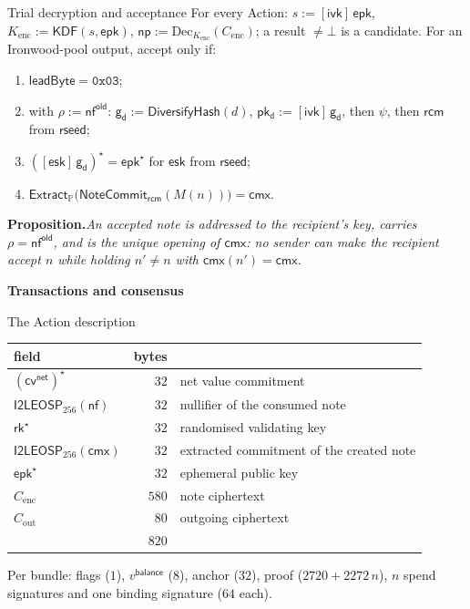 \documentclass[aspectratio=169,11pt]{beamer}
\newcommand{\nfsym}{\ensuremath{\mathsf{nf}}}
\newcommand{\cmx}{\ensuremath{\mathsf{cmx}}}
\newcommand{\cvsym}{\ensuremath{\mathsf{cv}}}
\newcommand{\rksym}{\ensuremath{\mathsf{rk}}}
\newcommand{\gd}{\ensuremath{\mathsf{g_d}}}
\newcommand{\pkd}{\ensuremath{\mathsf{pk_d}}}
\newcommand{\ivk}{\ensuremath{\mathsf{ivk}}}
\newcommand{\rcm}{\ensuremath{\mathsf{rcm}}}
\newcommand{\esk}{\ensuremath{\mathsf{esk}}}
\newcommand{\epk}{\ensuremath{\mathsf{epk}}}
\newcommand{\Extract}{\ensuremath{\mathsf{Extract}}}
\newcommand{\NoteCommit}{\ensuremath{\mathsf{NoteCommit}}}
\newcommand{\Ecenc}{\ensuremath{C_{\mathrm{enc}}}}
\newcommand{\Ecout}{\ensuremath{C_{\mathrm{out}}}}
\newcommand{\divider}[1]{\begin{frame}[plain]\vfill\centering
  {\usebeamercolor[fg]{structure}\Huge\bfseries #1}\vfill\end{frame}}
\newcommand{\PP}{\mathbb{P}}
\newcommand{\Ext}{\Extract_{\PP}}
\newcommand{\rk}{\rksym}
\newcommand{\Ilep}[1]{\mathsf{I2LEOSP}_{#1}}
\newcommand{\DivH}{\mathsf{DiversifyHash}}
\newcommand{\cvnet}{\cvsym^{\mathsf{net}}}
\newcommand{\vb}{v^{\mathsf{balance}}}
\newcommand{\old}{^{\mathsf{old}}}
\newcommand{\rseed}{\mathsf{rseed}}
\newcommand{\stmt}[2]{\par\smallskip\noindent\textbf{#1}\enspace\textit{#2}\par}
\begin{document}
\begin{frame}{Trial decryption and acceptance}
For every Action: $s := [\ivk]\,\epk$, $K_{\mathrm{enc}} := \mathsf{KDF}(s, \epk)$,
$\mathsf{np} := \mathrm{Dec}_{K_{\mathrm{enc}}}(\Ecenc)$; a result $\ne \bot$
is a candidate. For an Ironwood-pool output, accept only if:
\begin{enumerate}\itemsep4pt
\item[(i)] $\mathsf{leadByte} = \mathtt{0x03}$;
\item[(ii)] with $\rho := \nfsym\old$: $\gd := \DivH(d)$, $\pkd := [\ivk]\,\gd$,
  then $\psi$, then $\rcm$ from $\rseed$;
\item[(iii)] $([\esk]\,\gd)^{\star} = \epk^{\star}$ for $\esk$ from $\rseed$;
\item[(iv)] $\Ext\bigl(\NoteCommit_{\rcm}(M(n))\bigr) = \cmx$.
\end{enumerate}
\vfill
\stmt{Proposition.}{An accepted note is addressed to the recipient's key,
carries $\rho = \nfsym\old$, and is the unique opening of $\cmx$: no sender
can make the recipient accept $n$ while holding $n' \ne n$ with
$\cmx(n') = \cmx$.}
\end{frame}

\divider{Transactions and consensus}

\begin{frame}{The Action description}
\begin{center}
\begin{tabular}{@{}lrl@{}}
\toprule
field & bytes & \\
\midrule
$(\cvnet)^{\star}$ & $32$ & net value commitment \\
$\Ilep{256}(\nfsym)$ & $32$ & nullifier of the consumed note \\
$\rk^{\star}$ & $32$ & randomised validating key \\
$\Ilep{256}(\cmx)$ & $32$ & extracted commitment of the created note \\
$\epk^{\star}$ & $32$ & ephemeral public key \\
$\Ecenc$ & $580$ & note ciphertext \\
$\Ecout$ & $80$ & outgoing ciphertext \\
\midrule
& $820$ & \\
\bottomrule
\end{tabular}
\end{center}
\vfill
Per bundle: flags ($1$), $\vb$ ($8$), anchor ($32$), proof
($2720 + 2272\,n$), $n$ spend signatures and one binding signature ($64$ each).
\end{frame}
\end{document}
